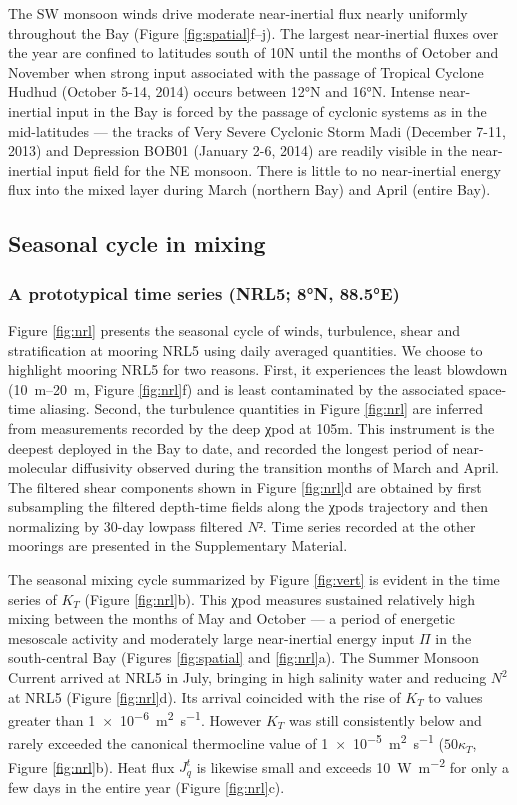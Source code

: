 \documentclass[twocol]{ametsoc}
\begin{document}
The SW monsoon winds drive moderate near-inertial flux nearly uniformly throughout the Bay (Figure \ref{fig:spatial}f--j).
The largest near-inertial fluxes over the year are confined to latitudes south of 10N until the months of October and November when strong input associated with the passage of Tropical Cyclone Hudhud (October 5-14, 2014) occurs between 12°N and 16°N.
Intense near-inertial input in the Bay is forced by the passage of cyclonic systems as in the mid-latitudes \citep{Alford2003} --- the tracks of Very Severe Cyclonic Storm Madi (December 7-11, 2013) and Depression BOB01 (January 2-6, 2014) are readily visible in the near-inertial input field for the NE monsoon.
There is little to no near-inertial energy flux into the mixed layer during March (northern Bay) and April (entire Bay).


\subsection{Seasonal cycle in mixing}
\label{sec:orgbcce381}
\subsubsection*{A prototypical time series (NRL5; 8°N, 88.5°E)}
\label{sec:org1c0c44b}
\label{sec:nrl}

Figure \ref{fig:nrl} presents the seasonal cycle of winds, turbulence, shear and stratification at mooring NRL5 using daily averaged quantities.
We choose to highlight mooring NRL5  for two reasons.
First, it experiences the least blowdown (\SIrange{10}{20}{\meter}, Figure \ref{fig:nrl}f) and is least contaminated by the associated space-time aliasing.
Second, the turbulence quantities in Figure \ref{fig:nrl} are inferred from measurements recorded by the deep χpod at 105m.
This instrument is the deepest deployed in the Bay to date, and recorded the longest period of
near-molecular diffusivity observed during the transition months of March and April.
The filtered shear components shown in Figure \ref{fig:nrl}d are obtained by first subsampling the filtered depth-time fields along the χpods trajectory and then normalizing by 30-day lowpass filtered \(N²\).
Time series recorded at the other moorings are presented in the Supplementary Material.

The seasonal mixing cycle summarized by Figure \ref{fig:vert} is evident in the time series of \(K_T\) (Figure \ref{fig:nrl}b).
This χpod measures sustained relatively high mixing between the months of May and October --- a period of energetic mesoscale activity and moderately large near-inertial energy input \(Π\) in the south-central Bay (Figures \ref{fig:spatial} and \ref{fig:nrl}a).
The Summer Monsoon Current arrived at NRL5 in July, bringing in high salinity water and reducing \(N^2\) at NRL5 (Figure \ref{fig:nrl}d).
Its arrival coincided with the rise of \(K_T\) to values greater than \SI{1e-6}{\meter\squared\per\second}.
However \(K_T\) was still consistently below and rarely exceeded the canonical thermocline value of \SI{1e-5}{\m\squared\per\s} (\(50κ_T\), Figure \ref{fig:nrl}b).
Heat flux \(J_q^t\) is likewise small and exceeds \SI{10}{\W\per\m\squared} for only a few days in the entire year (Figure \ref{fig:nrl}c).
\end{document}
